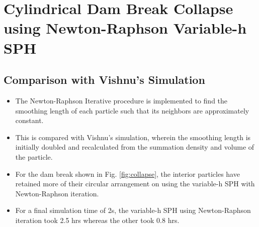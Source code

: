 \documentclass{article}
\begin{document}
\section{Cylindrical Dam Break Collapse using Newton-Raphson Variable-h SPH}
\subsection{Comparison with Vishnu's Simulation}
\begin{itemize}
\item The Newton-Raphson Iterative procedure is implemented to find the
smoothing length of each particle such that its neighbors are approximately
constant.  
\item This is compared with Vishnu's simulation, wherein the smoothing length is
initially doubled and recalculated from the summation density and volume of the
particle.
\item For the dam break shown in Fig. \ref{fig:collapse}, the interior
particles have retained more of their circular arrangement on using the 
variable-h SPH with Newton-Raphson iteration.
\item For a final simulation time of 2s, the variable-h SPH using
Newton-Raphson iteration took 2.5 hrs whereas the other took 0.8 hrs.
\end{itemize}
\end{document}
